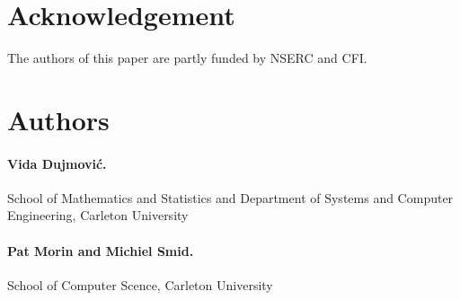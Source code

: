 \documentclass{patmorin}
\begin{document}
\section*{Acknowledgement}

The authors of this paper are partly funded by NSERC and CFI.

\section*{Authors}

\paragraph{Vida Dujmovi\'c.}
School of Mathematics and Statistics and Department of Systems and Computer Engineering, Carleton University

\paragraph{Pat Morin and Michiel Smid.}
School of Computer Scence, Carleton University




\end{document}
